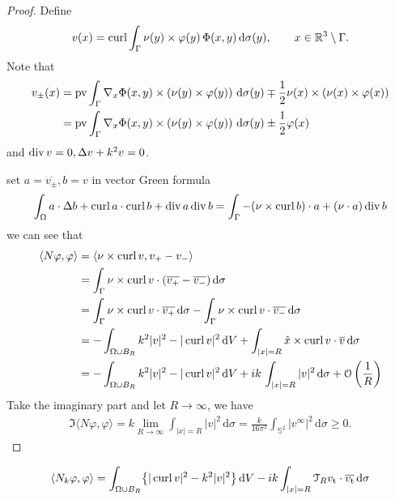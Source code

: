 \begin{proof}
Define 
\begin{align}\label{eq:v}
  v(x) = \operatorname{curl}\int_{\Gamma}\nu(y)\times\varphi(y)\,\Phi(x,y)\,\text{d}\sigma(y),\qquad x\in\mathbb{R}^3\setminus\Gamma.
\end{align}
Note that 
  \begin{align*}
  v_\pm(x) &= \operatorname{pv}\int_{\Gamma}\nabla_x\Phi(x, y)\times\left(\nu(y)\times\varphi(y)\right)\,\text{d}\sigma(y)\mp\frac{1}{2}\nu(x)\times(\nu(x)\times\varphi(x))\\ 
  &= \operatorname{pv}\int_{\Gamma}\nabla_x\Phi(x, y)\times\left(\nu(y)\times\varphi(y)\right)\,\text{d}\sigma(y)\pm\frac{1}{2}\varphi(x) 
  \end{align*}
and $\operatorname{div} v=0, \Delta v + k^2 v=0$. 

set $a=\overline{v_\pm}, b=v$ in vector Green formula
\begin{align*}
  \int_{\Omega}a\cdot\Delta b+\operatorname{curl} a\cdot\operatorname{curl} b + \operatorname{div} a\operatorname{div} b=\int_{\Gamma}-(\nu\times\operatorname{curl} b)\cdot a+(\nu\cdot a)\operatorname{div} b
\end{align*}
we can see that
  \begin{align*}
    \langle N\varphi, \varphi\rangle &=\left\langle \nu\times\operatorname{curl} v, v_+-v_-\right\rangle \\
    &=\int_{\Gamma}\nu\times\operatorname{curl} v\cdot(\overline{v_+} - \overline{v_-})\,\text{d}\sigma \\
    &=\int_{\Gamma}\nu\times\operatorname{curl} v\cdot\overline{v_+}\,\text{d}\sigma- \int_{\Gamma}\nu\times\operatorname{curl} v\cdot\overline{v_-}\,\text{d}\sigma\\
    &=-\int_{\Omega\cup B_R}k^2|v|^2 - |\operatorname{curl} v|^2\,\text{d}V + \int_{|x|=R}\hat{x}\times\operatorname{curl} v\cdot\overline{v}\,\text{d}\sigma \\
    &=-\int_{\Omega\cup B_R}k^2|v|^2 - |\operatorname{curl} v|^2\,\text{d}V + ik\,\int_{|x|=R}|v|^2\,\text{d}\sigma+\mathcal{O}\left(\frac{1}{R}\right)
  \end{align*}
Take the imaginary part and let $R\to\infty$, we have
  \begin{align*}
    \Im\langle N\varphi,\varphi\rangle = k\lim_{R\to\infty}\int_{|x|=R}|v|^2\,\text{d}\sigma = \frac{k}{16\pi^2}\int_{\mathbb{S}^2}|v^\infty|^2\,\text{d}\sigma\geqslant 0.
  \end{align*}
\end{proof}

\begin{align*}
  \langle N_k\varphi, \varphi\rangle 
  &=\int_{\Omega\cup B_R}\bigl\{|\operatorname{curl} v|^2 - k^2|v|^2\bigr\} \,\text{d}V -ik \int_{|x|=R}\mathcal{T}_R v_{\text{t}}\cdot\overline{v_{\text{t}}}\,\text{d}\sigma \\
\end{align*}

